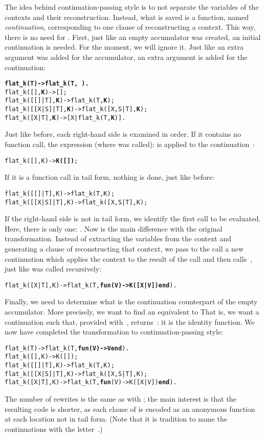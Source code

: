The idea behind continuation\hyp{}passing style is to not separate the
variables of the contexts and their reconstruction. Instead, what is
saved is a function, named \emph{continuation}, corresponding to one
clause of  reconstructing a context. This way, there
is no need for . First, just like an empty accumulator
was created, an initial continuation is needed. For the moment, we
will ignore it. Just like an extra argument was added for the
accumulator, an extra argument is added for the continuation:
\begin{alltt}
\textbf{flat\_k(T)           -> flat\_k(T,\,).}
flat\_k(       [],\textbf{K}) -> [];\hfill% K \emph{unused yet}
flat\_k(   [[]|T],\textbf{K}) -> flat\_k(T,\textbf{K});
flat\_k([[X|S]|T],\textbf{K}) -> flat\_k([X,S|T],\textbf{K});
flat\_k(    [X|T],\textbf{K}) -> [X|flat\_k(T,\textbf{K})].
\end{alltt}
Just like before, each right\hyp{}hand side is examined in order. If
it contains no function call, the expression (where 
was called): is applied to the continuation~:
\begin{alltt}
flat\_k(       [],K) -> \textbf{K([])};
\end{alltt}
If it is a function call in tail form, nothing is done, just like
before:
\begin{alltt}
flat\_k(   [[]|T],K) -> flat\_k(T,K);
flat\_k([[X|S]|T],K) -> flat\_k([X,S|T],K);
\end{alltt}
If the right\hyp{}hand side is not in tail form, we identify the first
call to be evaluated. Here, there is only one:
. Now is the main difference with the original
transformation. Instead of extracting the variables from the context
and generating a clause of  reconstructing that
context, we pass to the call a new continuation which applies the
context to the result of the call and then calls~, just
like  was called recursively:
\begin{alltt}
flat\_k(    [X|T],K) -> flat\_k(T,\textbf{fun(V) -> K([X|V]) end}).
\end{alltt}
Finally, we need to determine what is the continuation counterpart of
the empty accumulator. More precisely, we want to find an equivalent
to  That is, we want a continuation such
that, provided with~, returns~: it is the
identity function. We now have completed the transformation to
continuation\hyp{}passing style:
\begin{alltt}
flat\_k(T)           -> flat\_k(T,\textbf{fun(V) -> V end}).
flat\_k(       [],K) -> K([]);
flat\_k(   [[]|T],K) -> flat\_k(T,K);
flat\_k([[X|S]|T],K) -> flat\_k([X,S|T],K);
flat\_k(    [X|T],K) -> flat\_k(T,\textbf{fun}(V) -> K([X|V]) \textbf{end}).
\end{alltt}
The number of rewrites is the same as with ; the
main interest is that the resulting code is shorter, as each clause of
 is encoded as an anonymous function at each location
not in tail form. (Note that it is tradition to name the continuations
with the letter~.)

